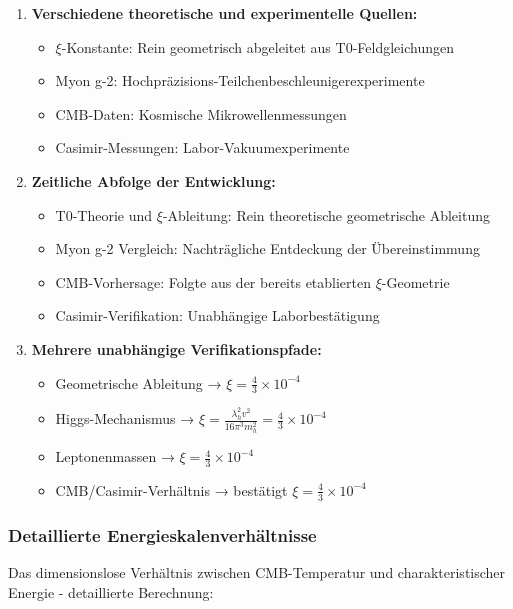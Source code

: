 	\begin{enumerate}
		\item \textbf{Verschiedene theoretische und experimentelle Quellen:}
		\begin{itemize}
			\item $\xi$-Konstante: Rein geometrisch abgeleitet aus T0-Feldgleichungen
			\item Myon g-2: Hochpräzisions-Teilchenbeschleunigerexperimente
			\item CMB-Daten: Kosmische Mikrowellenmessungen
			\item Casimir-Messungen: Labor-Vakuumexperimente
		\end{itemize}
		
		\item \textbf{Zeitliche Abfolge der Entwicklung:}
		\begin{itemize}
			\item T0-Theorie und $\xi$-Ableitung: Rein theoretische geometrische Ableitung
			\item Myon g-2 Vergleich: Nachträgliche Entdeckung der Übereinstimmung
			\item CMB-Vorhersage: Folgte aus der bereits etablierten $\xi$-Geometrie
			\item Casimir-Verifikation: Unabhängige Laborbestätigung
		\end{itemize}
		
		\item \textbf{Mehrere unabhängige Verifikationspfade:}
		\begin{itemize}
			\item Geometrische Ableitung → $\xi = \frac{4}{3} \times 10^{-4}$
			\item Higgs-Mechanismus → $\xi = \frac{\lambda_h^2 v^2}{16\pi^3 m_h^2} = \frac{4}{3} \times 10^{-4}$
			\item Leptonenmassen → $\xi = \frac{4}{3} \times 10^{-4}$
			\item CMB/Casimir-Verhältnis → bestätigt $\xi = \frac{4}{3} \times 10^{-4}$
		\end{itemize}
	\end{enumerate}
	
	\subsubsection{Detaillierte Energieskalenverhältnisse}
	
	Das dimensionslose Verhältnis zwischen CMB-Temperatur und charakteristischer Energie - detaillierte Berechnung:
	
